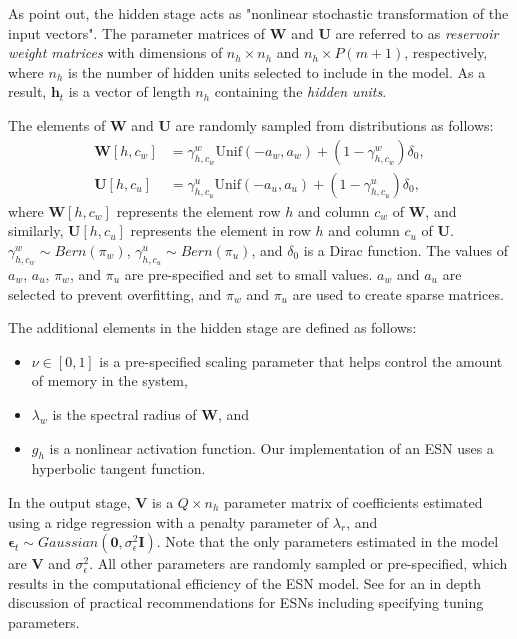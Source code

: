 \documentclass[AMS,STIX2COL]{WileyNJD-v2}
\begin{document}
As \citet{mcdermott2019} point out, the hidden stage acts as "nonlinear stochastic transformation of the input vectors". The parameter matrices of $\textbf{W}$ and $\textbf{U}$ are referred to as \emph{reservoir weight matrices} with dimensions of $n_h\times n_h$ and $n_h\times P(m+1)$, respectively, where $n_h$ is the number of hidden units selected to include in the model. As a result, $\textbf{h}_t$ is a vector of length $n_h$ containing the \emph{hidden units}.

The elements of $\textbf{W}$ and $\textbf{U}$ are randomly sampled from distributions as follows:
\begin{align}
    \textbf{W}[h,c_w] &=\gamma_{h,c_w}^w\mbox{Unif}(-a_w,a_w)+(1-\gamma_{h,c_w}^w)\delta_0,\\
    \textbf{U}[h,c_u] &=\gamma_{h,c_u}^u\mbox{Unif}(-a_u,a_u)+(1-\gamma_{h,c_u}^u)\delta_0,
\end{align}
where $\textbf{W}[h,c_w]$ represents the element row $h$ and column $c_w$ of $\textbf{W}$, and similarly, $\textbf{U}[h,c_u]$ represents the element in row $h$ and column $c_u$ of $\textbf{U}$. $\gamma_{h,c_w}^w \sim Bern(\pi_w)$, $\gamma_{h,c_u}^u \sim Bern(\pi_u)$, and $\delta_0$ is a Dirac function. The values of $a_w$, $a_u$, $\pi_w$, and $\pi_u$ are pre-specified and set to small values. $a_w$ and $a_u$ are selected to prevent overfitting, and $\pi_w$ and $\pi_u$ are used to create sparse matrices.

The additional elements in the hidden stage are defined as follows:
\begin{itemize}
    \item $\nu\in[0,1]$ is a pre-specified scaling parameter that helps control the amount of memory in the system,
    \item $\lambda_w$ is the spectral radius of $\textbf{W}$, and
    \item $g_h$ is a nonlinear activation function. Our implementation of an ESN uses a hyperbolic tangent function.
\end{itemize}

In the output stage, $\textbf{V}$ is a $Q\times n_h$ parameter matrix of coefficients estimated using a ridge regression with a penalty parameter of $\lambda_r$, and $\boldsymbol{\epsilon}_{t} \sim Gaussian\left(\mathbf{0}, \sigma_{\epsilon}^2 \mathbf{I}\right)$. Note that the only parameters estimated in the model are $\mathbf{V}$ and $\sigma^2_\epsilon$. All other parameters are randomly sampled or pre-specified, which results in the computational efficiency of the ESN model. See \citet{lukosevicius2012} for an in depth discussion of practical recommendations for ESNs including specifying tuning parameters.
\end{document}
